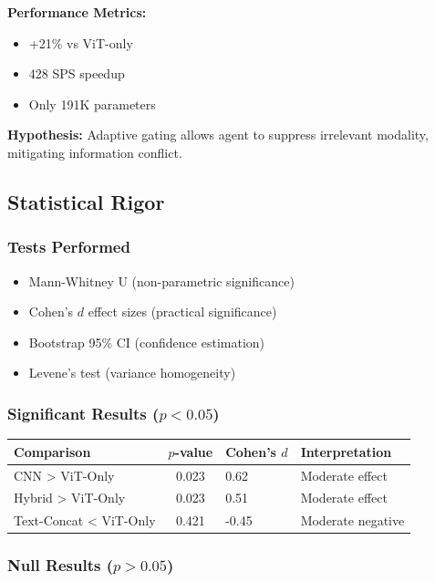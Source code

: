 \documentclass[12pt,a4paper,openany]{report}
\begin{document}
\textbf{Performance Metrics:}
\begin{itemize}
    \item +21\% vs ViT-only
    \item 428 SPS speedup
    \item Only 191K parameters
\end{itemize}

\textbf{Hypothesis:} Adaptive gating allows agent to suppress irrelevant modality, mitigating information conflict.

\subsection{Statistical Rigor}

\subsubsection{Tests Performed}

\begin{itemize}
    \item Mann-Whitney U (non-parametric significance)
    \item Cohen's $d$ effect sizes (practical significance)
    \item Bootstrap 95\% CI (confidence estimation)
    \item Levene's test (variance homogeneity)
\end{itemize}

\subsubsection{Significant Results ($p < 0.05$)}

\begin{table}[H]
\centering
\small
\begin{tabular}{lcll}
\toprule
Comparison & $p$-value & Cohen's $d$ & Interpretation \\
\midrule
CNN > ViT-Only & 0.023 & 0.62 & Moderate effect \\
Hybrid > ViT-Only & 0.023 & 0.51 & Moderate effect \\
Text-Concat < ViT-Only & 0.421 & -0.45 & Moderate negative \\
\bottomrule
\end{tabular}
\end{table}

\subsubsection{Null Results ($p > 0.05$)}
\end{document}
